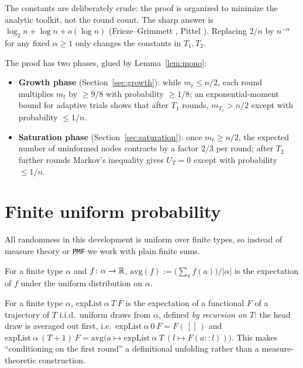 \begin{remark}
  The constants are deliberately crude: the proof is organized to minimize
  the analytic toolkit, not the round count. The sharp answer is
  $\log_2 n + \log n + o(\log n)$ (Frieze--Grimmett \cite{FG85}, Pittel
  \cite{Pittel87}). Replacing $2/n$ by $n^{-\alpha}$ for any fixed
  $\alpha \ge 1$ only changes the constants in $T_1, T_2$.
\end{remark}

The proof has two phases, glued by Lemma~\ref{lem:mono}:
\begin{itemize}
\item \textbf{Growth phase} (Section~\ref{sec:growth}): while $m_t \le n/2$,
  each round multiplies $m_t$ by $\ge 9/8$ with probability $\ge 1/8$;
  an exponential-moment bound for adaptive trials shows that after $T_1$
  rounds, $m_{T_1} > n/2$ except with probability $\le 1/n$.
\item \textbf{Saturation phase} (Section~\ref{sec:saturation}): once
  $m_t \ge n/2$, the expected number of uninformed nodes contracts by a
  factor $2/3$ per round; after $T_2$ further rounds Markov's inequality
  gives $U_T = 0$ except with probability $\le 1/n$.
\end{itemize}

\section{Finite uniform probability}\label{sec:prelim}

All randomness in this development is uniform over finite types, so instead
of measure theory or \texttt{PMF} we work with plain finite sums.

\begin{definition}[Average]\label{def:avg}
  \leanok
  For a finite type $\alpha$ and $f \colon \alpha \to \mathbb{R}$,
  $\mathrm{avg}(f) := \bigl(\sum_{a} f(a)\bigr) / |\alpha|$ is the
  expectation of $f$ under the uniform distribution on $\alpha$.
\end{definition}

\begin{definition}\label{def:expList}
  \leanok
  For a finite type $\alpha$, $\mathrm{expList}\ \alpha\ T\ F$ is the
  expectation of a functional $F$ of a trajectory of $T$ i.i.d.\ uniform
  draws from $\alpha$, defined \emph{by recursion on $T$}: the head draw is
  averaged out first, i.e.\ $\mathrm{expList}\ \alpha\ 0\ F = F(\,[]\,)$ and
  $\mathrm{expList}\ \alpha\ (T{+}1)\ F
    = \mathrm{avg}\bigl(a \mapsto \mathrm{expList}\ \alpha\ T\ (l \mapsto
    F(a :: l))\bigr)$.
  This makes ``conditioning on the first round'' a definitional unfolding
  rather than a measure-theoretic construction.
\end{definition}

